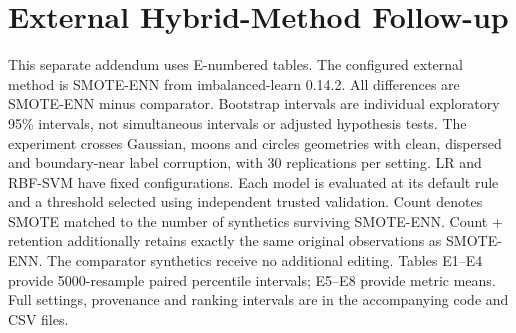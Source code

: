 \section*{External Hybrid-Method Follow-up}
This separate addendum uses E-numbered tables. The configured external method is SMOTE-ENN from imbalanced-learn 0.14.2. All differences are SMOTE-ENN minus comparator. Bootstrap intervals are individual exploratory 95\% intervals, not simultaneous intervals or adjusted hypothesis tests.
The experiment crosses Gaussian, moons and circles geometries with clean, dispersed and boundary-near label corruption, with 30 replications per setting. LR and RBF-SVM have fixed configurations. Each model is evaluated at its default rule and a threshold selected using independent trusted validation. Count denotes SMOTE matched to the number of synthetics surviving SMOTE-ENN. Count + retention additionally retains exactly the same original observations as SMOTE-ENN. The comparator synthetics receive no additional editing. Tables E1--E4 provide 5000-resample paired percentile intervals; E5--E8 provide metric means. Full settings, provenance and ranking intervals are in the accompanying code and CSV files.


